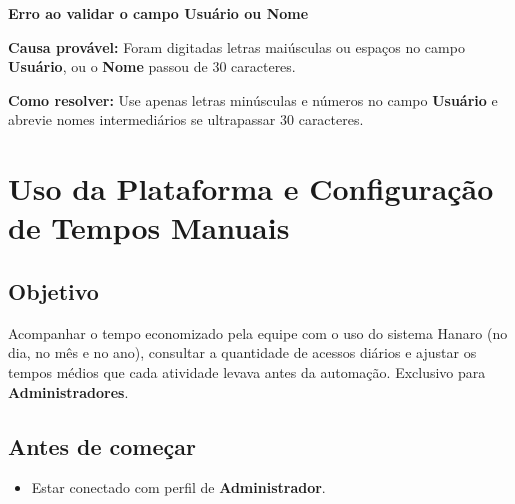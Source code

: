 \begin{remark}
\textbf{Erro ao validar o campo Usuário ou Nome}\par
\textbf{Causa provável:} Foram digitadas letras maiúsculas ou espaços no campo \textbf{Usuário}, ou o \textbf{Nome} passou de 30 caracteres.\par
\textbf{Como resolver:} Use apenas letras minúsculas e números no campo \textbf{Usuário} e abrevie nomes intermediários se ultrapassar 30 caracteres.
\end{remark}

\Needspace{190pt}
\section{Uso da Plataforma e Configuração de Tempos Manuais}

\subsection*{Objetivo}

Acompanhar o tempo economizado pela equipe com o uso do sistema Hanaro (no dia, no mês e no ano), consultar a quantidade de acessos diários e ajustar os tempos médios que cada atividade levava antes da automação. Exclusivo para \textbf{Administradores}.\par

\subsection*{Antes de começar}

\begin{itemize}
\item Estar conectado com perfil de \textbf{Administrador}.
\end{itemize}


